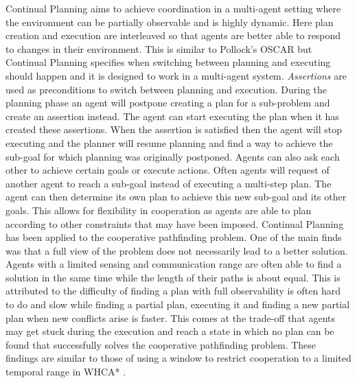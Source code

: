 Continual Planning \cite{brenner2009} aims to achieve coordination in a
multi-agent setting where the environment can be partially observable and is
highly dynamic. Here plan creation and execution are interleaved so that agents
are better able to respond to changes in their environment. This is similar to
Pollock's OSCAR \cite{pollock1995} but Continual Planning specifies when
switching between planning and executing should happen and it is designed to
work in a multi-agent system. \emph{Assertions} are used as preconditions to
switch between planning and execution. During the planning phase an agent will
postpone creating a plan for a sub-problem and create an assertion instead. The
agent can start executing the plan when it has created these assertions. When
the assertion is satisfied then the agent will stop executing and the planner
will resume planning and find a way to achieve the sub-goal for which planning
was originally postponed. Agents can also ask each other to achieve certain
goals or execute actions. Often agents will request of another agent to reach a
sub-goal instead of executing a multi-step plan. The agent can then determine
its own plan to achieve this new sub-goal and its other goals. This allows for
flexibility in cooperation as agents are able to plan according to other
constraints that may have been imposed. Continual Planning has been
applied to the cooperative pathfinding problem. One of the main finds was that
a full view of the problem does not necessarily lead to a better solution.
Agents with a limited sensing and communication range are often able to find a
solution in the same time while the length of their paths is about equal. This
is attributed to the difficulty of finding a plan with full observability is
often hard to do and slow while finding a partial plan, executing it and
finding a new partial plan when new conflicts arise is faster. This comes at the
trade-off that agents may get stuck during the execution and reach a state in
which no plan can be found that successfully solves the cooperative pathfinding
problem. These findings are similar to those of using a window to restrict
cooperation to a limited temporal range in WHCA* \cite{silver2005}.